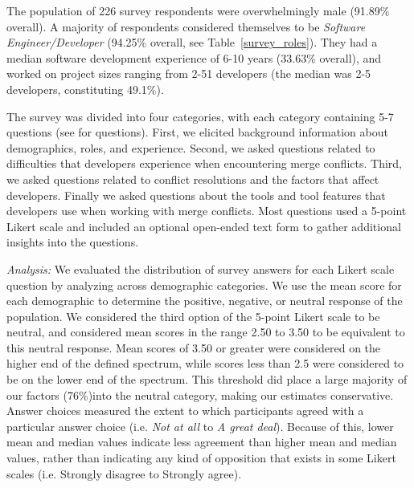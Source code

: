 The population of 226 survey respondents were overwhelmingly male (91.89\% overall). A majority of respondents considered themselves to be \textit{Software Engineer/Developer} (94.25\% overall, see Table~\ref{survey_roles}). They had a median software development experience of 6-10 years (33.63\% overall), and worked on project sizes ranging from 2-51 developers (the median was 2-5 developers, constituting 49.1\%).

The survey was divided into four categories, with each category containing 5-7 questions (see \cite{companion_site} for questions).
First, we elicited background information about demographics, roles, and experience.
Second, we asked questions related to difficulties that developers experience when encountering merge conflicts.
Third, we asked questions related to conflict resolutions and the factors that affect developers.
Finally we asked questions about the tools and tool features that developers use when working with merge conflicts.
Most questions used a 5-point Likert scale and included an optional open-ended text form to gather additional insights into the questions. 

\textit{Analysis:} We evaluated the distribution of survey answers for each Likert scale question by analyzing across demographic categories. 
We use the mean score for each demographic to determine the positive, negative, or neutral response of the population. 
We considered the third option of the 5-point Likert scale to be neutral, and considered mean scores in the range 2.50 to 3.50 to be equivalent to this neutral response. Mean scores of 3.50 or greater were considered on the higher end of the defined spectrum, while scores less than 2.5 were considered to be on the lower end of the spectrum. This threshold did place a large majority of our factors (76\%)into the neutral category, making our estimates conservative.
Answer choices measured the extent to which participants agreed with a particular answer choice (i.e. \textit{Not at all} to \textit{A great deal}). Because of this, lower mean and median values indicate less agreement than higher mean and median values, rather than indicating any kind of opposition that exists in some Likert scales (i.e. Strongly disagree to Strongly agree).